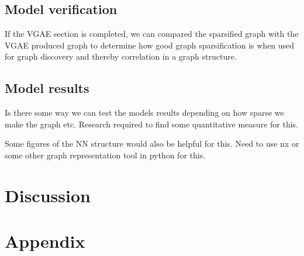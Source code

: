 \documentclass[honours,12pt]{unswthesis}
\numberwithin{equation}{section}
\begin{document}
{\section{Model verification}}\label{model-verification}
If the VGAE section is completed, we can compared the sparsified graph with the VGAE
produced graph to determine how good graph sparsification is when used for graph discovery
and thereby correlation in a graph structure.

{\section{Model results}}\label{model-results}
Is there some way we can test the models results depending on how sparse we make the graph etc.
Research required to find some quantitative measure for this.

Some figures of the NN structure would also be helpful for this.
Need to use nx or some other graph representation tool in python for this.

\chapter{Discussion}\label{dis}

\chapter{Appendix}\label{app}



\clearpage
{}
{}

\end{document}
